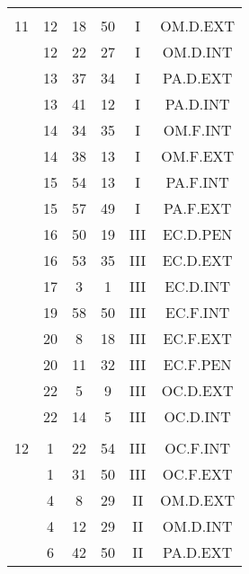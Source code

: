 \documentclass[12pt, a4paper]{article}
\begin{document}
\begin{multicols}{3}
{\begin{tabular}{c c c c c c}
	 	 	 	 & & & & & \\%
	 	 	 	11 & 12 & 18 & 50 & I & OM.D.EXT\\%
	 	 	 	 & 12 & 22 & 27 & I & OM.D.INT\\%
	 	 	 	 & 13 & 37 & 34 & I & PA.D.EXT\\%
	 	 	 	 & 13 & 41 & 12 & I & PA.D.INT\\%
	 	 	 	 & 14 & 34 & 35 & I & OM.F.INT\\%
	 	 	 	 & 14 & 38 & 13 & I & OM.F.EXT\\%
	 	 	 	 & 15 & 54 & 13 & I & PA.F.INT\\%
	 	 	 	 & 15 & 57 & 49 & I & PA.F.EXT\\%
	 	 	 	 & 16 & 50 & 19 & III & EC.D.PEN\\%
	 	 	 	 & 16 & 53 & 35 & III & EC.D.EXT\\%
	 	 	 	 & 17 & 3 & 1 & III & EC.D.INT\\%
	 	 	 	 & 19 & 58 & 50 & III & EC.F.INT\\%
	 	 	 	 & 20 & 8 & 18 & III & EC.F.EXT\\%
	 	 	 	 & 20 & 11 & 32 & III & EC.F.PEN\\%
	 	 	 	 & 22 & 5 & 9 & III & OC.D.EXT\\%
	 	 	 	 & 22 & 14 & 5 & III & OC.D.INT\\%
	 	 	 	 & & & & & \\%
	 	 	 	12 & 1 & 22 & 54 & III & OC.F.INT\\%
	 	 	 	 & 1 & 31 & 50 & III & OC.F.EXT\\%
	 	 	 	 & 4 & 8 & 29 & II & OM.D.EXT\\%
	 	 	 	 & 4 & 12 & 29 & II & OM.D.INT\\%
	 	 	 	 & 6 & 42 & 50 & II & PA.D.EXT\\%
	 	 \end{tabular}
 	}
\end{multicols}
\end{document}
